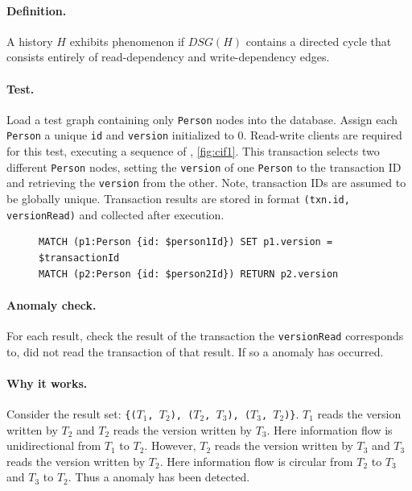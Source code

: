 \paragraph{Definition.}
A history $H$ exhibits phenomenon  if $\textit{DSG}(H)$ contains a directed cycle that consists entirely of read-dependency and write-dependency edges.

\paragraph{Test.}
Load a test graph containing only \texttt{Person} nodes into the database.
Assign each \texttt{Person} a unique \texttt{id} and \texttt{version} initialized to 0.
Read-write clients are required for this test, executing a sequence of , \autoref{fig:cif1}.
This transaction selects two different \texttt{Person} nodes, setting the \texttt{version} of one \texttt{Person} to the transaction ID and retrieving the \texttt{version} from the other.
Note, transaction IDs are assumed to be globally unique.
Transaction results are stored in format \texttt{(txn.id, versionRead)} and collected after execution.

\begin{figure}
\begin{lstlisting}[language=cypher,label=fig:cif1,caption=\tx{G1c $T_\mathrm{RW}$}.]
MATCH (p1:Person {id: $person1Id}) SET p1.version = $transactionId
MATCH (p2:Person {id: $person2Id}) RETURN p2.version
\end{lstlisting}
\end{figure}

\paragraph{Anomaly check.}
For each result, check the result of the transaction the \texttt{versionRead} corresponds to, did not read the transaction of that result.
If so a  anomaly has occurred.

\paragraph{Why it works.}
Consider the result set:
\texttt{\{($T_\mathrm{1}$, $T_\mathrm{2}$), ($T_\mathrm{2}$, $T_\mathrm{3}$), ($T_\mathrm{3}$, $T_\mathrm{2}$)\}}.
$T_\mathrm{1}$ reads the version written by $T_\mathrm{2}$ and $T_\mathrm{2}$  reads the version written by $T_\mathrm{3}$.
Here information flow is unidirectional from $T_\mathrm{1}$ to $T_\mathrm{2}$.
However, $T_\mathrm{2}$ reads the version written by $T_\mathrm{3}$ and $T_\mathrm{3}$  reads the version written by $T_\mathrm{2}$.
Here information flow is circular from $T_\mathrm{2}$ to $T_\mathrm{3}$ and $T_\mathrm{3}$ to $T_\mathrm{2}$.
Thus a  anomaly has been detected.



